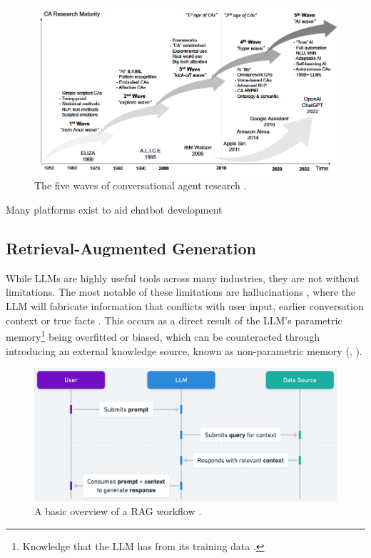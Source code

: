 \documentclass[12pt]{report}
\begin{document}
    \begin{figure}[H] 
        \centering
        \includegraphics[width=.8\linewidth]{ChatbotWaves.png}
        \caption{The five waves of conversational agent research \autocite{schobel_charting_2024}.}
        \label{fig:ChatbotWaves}
    \end{figure}

    Many platforms exist to aid chatbot development

    
    \subsection{Retrieval-Augmented Generation}
    
    While LLMs are highly useful tools across many industries, they are not without limitations. The most notable 
    of these limitations are hallucinations \autocite{lewis_retrieval-augmented_2021}, where the LLM will fabricate 
    information that conflicts with user input, earlier conversation context or true facts \autocite{zhang_sirens_2023}. This occurs as a direct result of the LLM's parametric memory\footnote{Knowledge that the LLM has from its training data \autocite{siriwardhana_improving_2023}.}
    being overfitted or biased, which can be counteracted through introducing an external knowledge source, known as non-parametric memory (\textcite{komeili_internet-augmented_2022}, \textcite{siriwardhana_improving_2023}).
    
    \begin{figure}[H] 
        \centering
        \includegraphics[width=.8\linewidth]{RAGProcess.png}
        \caption{A basic overview of a RAG workflow \autocite{openai_retrieval_nodate}.}
        \label{fig:RAGProcess}
    \end{figure}
\end{document}
